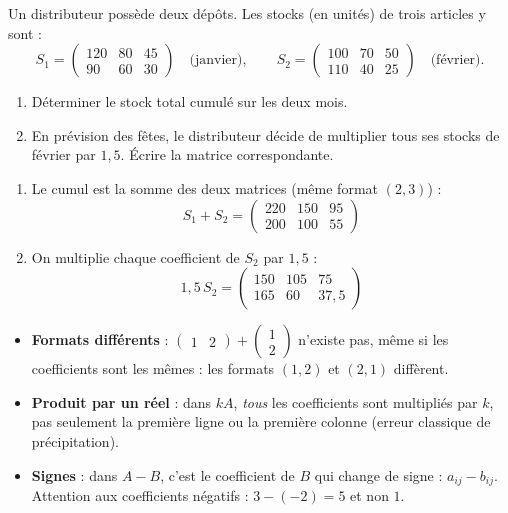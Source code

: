 \documentclass[11pt]{article}
\begin{document}
\begin{exoresolu}
Un distributeur possède deux dépôts. Les stocks (en unités) de trois articles y sont :
\[ S_1 = \begin{pmatrix} 120 & 80 & 45 \\ 90 & 60 & 30 \end{pmatrix} \quad \text{(janvier)}, \qquad S_2 = \begin{pmatrix} 100 & 70 & 50 \\ 110 & 40 & 25 \end{pmatrix} \quad \text{(février)}. \]
\begin{enumerate}
\item Déterminer le stock total cumulé sur les deux mois.
\item En prévision des fêtes, le distributeur décide de multiplier tous ses stocks de février par $1{,}5$. Écrire la matrice correspondante.
\end{enumerate}
\tcblower
\begin{enumerate}
\item Le cumul est la somme des deux matrices (même format $(2,3)$) :
\[ S_1 + S_2 = \begin{pmatrix} 220 & 150 & 95 \\ 200 & 100 & 55 \end{pmatrix} \]
\item On multiplie chaque coefficient de $S_2$ par $1{,}5$ :
\[ 1{,}5\,S_2 = \begin{pmatrix} 150 & 105 & 75 \\ 165 & 60 & 37{,}5 \end{pmatrix} \]
\end{enumerate}
\end{exoresolu}

\begin{attention}
\begin{itemize}
\item \textbf{Formats différents} : $\begin{pmatrix} 1 & 2 \end{pmatrix} + \begin{pmatrix} 1 \\ 2 \end{pmatrix}$ n'existe pas, même si les coefficients sont les mêmes : les formats $(1,2)$ et $(2,1)$ diffèrent.
\item \textbf{Produit par un réel} : dans $kA$, \emph{tous} les coefficients sont multipliés par $k$, pas seulement la première ligne ou la première colonne (erreur classique de précipitation).
\item \textbf{Signes} : dans $A - B$, c'est le coefficient de $B$ qui change de signe : $a_{ij} - b_{ij}$. Attention aux coefficients négatifs : $3 - (-2) = 5$ et non $1$.
\end{itemize}
\end{attention}
\end{document}
